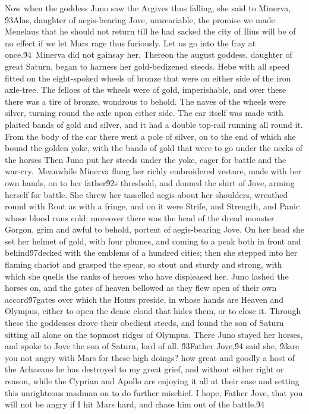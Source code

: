 {Now when the goddess Juno saw the Argives thus falling, she said to Minerva, \'93Alas, daughter of aegis-bearing Jove, unweariable, the promise we made Menelaus that he should not return till he had sacked the city of Ilius will be of no effect if we let Mars rage thus furiously. Let us go into the fray at once.\'94\
Minerva did not gainsay her. Thereon the august goddess, daughter of great Saturn, began to harness her gold-bedizened steeds. Hebe with all speed fitted on the eight-spoked wheels of bronze that were on either side of the iron axle-tree. The felloes of the wheels were of gold, imperishable, and over these there was a tire of bronze, wondrous to behold. The naves of the wheels were silver, turning round the axle upon either side. The car itself was made with plaited bands of gold and silver, and it had a double top-rail running all round it. From the body of the car there went a pole of silver, on to the end of which she bound the golden yoke, with the bands of gold that were to go under the necks of the horses Then Juno put her steeds under the yoke, eager for battle and the war-cry.\
Meanwhile Minerva flung her richly embroidered vesture, made with her own hands, on to her father\'92s threshold, and donned the shirt of Jove, arming herself for battle. She threw her tasselled aegis about her shoulders, wreathed round with Rout as with a fringe, and on it were Strife, and Strength, and Panic whose blood runs cold; moreover there was the head of the dread monster Gorgon, grim and awful to behold, portent of aegis-bearing Jove. On her head she set her helmet of gold, with four plumes, and coming to a peak both in front and behind\'97decked with the emblems of a hundred cities; then she stepped into her flaming chariot and grasped the spear, so stout and sturdy and strong, with which she quells the ranks of heroes who have displeased her. Juno lashed the horses on, and the gates of heaven bellowed as they flew open of their own accord\'97gates over which the Hours preside, in whose hands are Heaven and Olympus, either to open the dense cloud that hides them, or to close it. Through these the goddesses drove their obedient steeds, and found the son of Saturn sitting all alone on the topmost ridges of Olympus. There Juno stayed her horses, and spoke to Jove the son of Saturn, lord of all. \'93Father Jove,\'94 said she, \'93are you not angry with Mars for these high doings? how great and goodly a host of the Achaeans he has destroyed to my great grief, and without either right or reason, while the Cyprian and Apollo are enjoying it all at their ease and setting this unrighteous madman on to do further mischief. I hope, Father Jove, that you will not be angry if I hit Mars hard, and chase him out of the battle.\'94\
}
